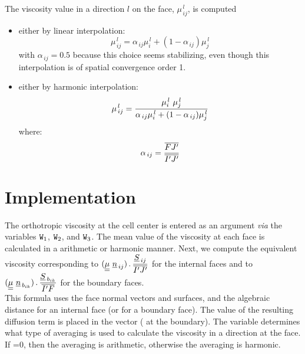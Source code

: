 The viscosity value in a direction $l$ on the face, $\mu_{\,ij}^{\,l}$,
is computed
\begin{itemize}
\item either by linear interpolation:
\begin{equation}
\mu_{\,ij}^{\,l}=\alpha_{\,ij}\mu_{i}^{\,l}+(1-\alpha_{\,ij})\mu_{j}^{\,l}
\end{equation}
with $\alpha_{\,ij}= 0.5$ because this choice seems stabilizing, even though
this interpolation is of spatial convergence order 1.
\item either by harmonic interpolation:
\begin{equation}\notag
\mu_{\,ij}^{\,l}=\displaystyle
\frac{\mu_{i}^{\,l}\ \mu_{j}^{\,l}}{\alpha_{\,ij}\mu_{i}^{\,l}+(1-\alpha_{\,ij}) \mu_{j}^{\,l}}
\end{equation}
where:
\begin{equation}\notag
\displaystyle \alpha_{\,ij}=\frac{\overline{FJ'}}{\overline{I'J'}}
\end{equation}
\end{itemize}

\section*{Implementation}

The orthotropic viscosity at the cell center is entered as an argument {\it via}
the variables $\text{\texttt{W}}_1$, $\text{\texttt{W}}_2$, and $\text{\texttt{W}}_3$. The mean value of the viscosity at each face
is calculated in a arithmetic or harmonic manner. Next, we compute the equivalent viscosity corresponding to
$\displaystyle (\tens{\mu}\ \underline{n}_{\,ij})\,.\,\frac{\underline{S}_{\,ij}}{\overline{I'J'}}$ for the internal faces and to $\displaystyle (\underline{\underline{\mu}}\ \underline{n}_{\,b_{ik}})\,.\,
\frac{\underline{S}_{\,b_{ik}}}{\overline{I'F}}$ for the boundary faces.\\

This formula uses the face normal vectors and surfaces,
and the algebraic distance  for an internal face (or  for a boundary face).
The value of the resulting diffusion term is placed in the vector  ( at the boundary).
The variable  determines what type of averaging is used to calculate the viscosity in
a direction at the face. If =0, then
the averaging is arithmetic, otherwise the averaging is harmonic.

